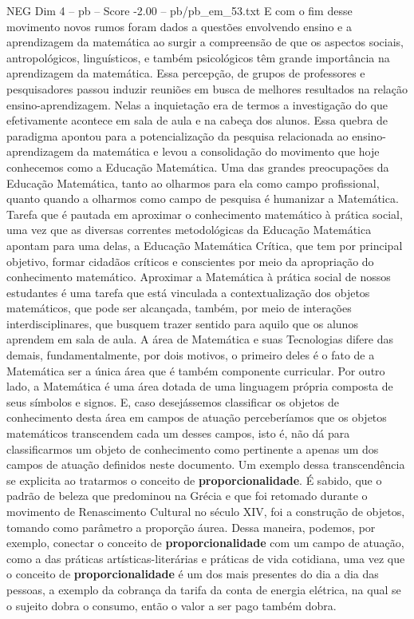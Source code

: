 \begin{textsample}{NEG Dim 4 – pb – Score -2.00 – pb/pb\_em\_53.txt}
E com o fim desse movimento novos rumos foram dados a questões envolvendo ensino e a aprendizagem da matemática ao surgir a compreensão de que os aspectos sociais, antropológicos, linguísticos, e também psicológicos têm grande importância na aprendizagem da matemática.
Essa percepção, de grupos de professores e pesquisadores passou induzir reuniões em busca de melhores resultados na relação ensino-aprendizagem.
Nelas a inquietação era de termos a investigação do que efetivamente acontece em sala de aula e na cabeça dos alunos.
Essa quebra de paradigma apontou para a potencialização da pesquisa relacionada ao ensino-aprendizagem da matemática e levou a consolidação do movimento que hoje conhecemos como a Educação Matemática.
Uma das grandes preocupações da Educação Matemática, tanto ao olharmos para ela como campo profissional, quanto quando a olharmos como campo de pesquisa é humanizar a Matemática.
Tarefa que é pautada em aproximar o conhecimento matemático à prática social, uma vez que as diversas correntes metodológicas da Educação Matemática apontam para uma delas, a Educação Matemática Crítica, que tem por principal objetivo, formar cidadãos críticos e conscientes por meio da apropriação do conhecimento matemático.
Aproximar a Matemática à prática social de nossos estudantes é uma tarefa que está vinculada a contextualização dos objetos matemáticos, que pode ser alcançada, também, por meio de interações interdisciplinares, que busquem trazer sentido para aquilo que os alunos aprendem em sala de aula.
A área de Matemática e suas Tecnologias difere das demais, fundamentalmente, por dois motivos, o primeiro deles é o fato de a Matemática ser a única área que é também componente curricular.
Por outro lado, a Matemática é uma área dotada de uma linguagem própria composta de seus símbolos e signos.
E, caso desejássemos classificar os objetos de conhecimento desta área em campos de atuação perceberíamos que os objetos matemáticos transcendem cada um desses campos, isto é, não dá para classificarmos um objeto de conhecimento como pertinente a apenas um dos campos de atuação definidos neste documento.
Um exemplo dessa transcendência se explicita ao tratarmos o conceito de \textbf{proporcionalidade}.
É sabido, que o padrão de beleza que predominou na Grécia e que foi retomado durante o movimento de Renascimento Cultural no século XIV, foi a construção de objetos, tomando como parâmetro a proporção áurea.
Dessa maneira, podemos, por exemplo, conectar o conceito de \textbf{proporcionalidade} com um campo de atuação, como a das práticas artísticas-literárias e práticas de vida cotidiana, uma vez que o conceito de \textbf{proporcionalidade} é um dos mais presentes do dia a dia das pessoas, a exemplo da cobrança da tarifa da conta de energia elétrica, na qual se o sujeito dobra o consumo, então o valor a ser pago também dobra.

\end{textsample}
